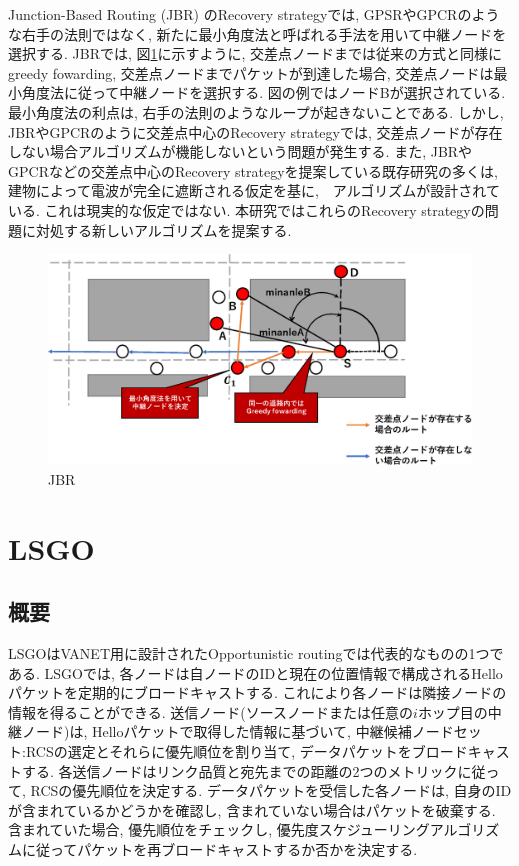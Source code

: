 \documentclass[10pt]{jreport}
\begin{document}
Junction-Based Routing (JBR) \cite{JBR}のRecovery strategyでは, GPSRやGPCRのような右手の法則ではなく, 新たに最小角度法と呼ばれる手法を用いて中継ノードを選択する. JBRでは, 図\ref{fig:JBR}に示すように, 交差点ノードまでは従来の方式と同様にgreedy fowarding, 交差点ノードまでパケットが到達した場合, 交差点ノードは最小角度法に従って中継ノードを選択する. 図の例ではノードBが選択されている. 最小角度法の利点は, 右手の法則のようなループが起きないことである. 
しかし, JBRやGPCRのように交差点中心のRecovery strategyでは, 交差点ノードが存在しない場合アルゴリズムが機能しないという問題が発生する. また, JBRやGPCRなどの交差点中心のRecovery strategyを提案している既存研究の多くは, 建物によって電波が完全に遮断される仮定を基に,　アルゴリズムが設計されている. これは現実的な仮定ではない. 
本研究ではこれらのRecovery strategyの問題に対処する新しいアルゴリズムを提案する. 

\begin{figure}[!ht]
	\centering
	\includegraphics[width=140mm]{figures/JBR.eps}
	\caption{JBR}
	\label{fig:JBR}
\end{figure}



\chapter{LSGO}
\label{LSGO}
\section{概要}
LSGO\cite{18}はVANET用に設計されたOpportunistic routingでは代表的なものの1つである.
LSGOでは, 各ノードは自ノードのIDと現在の位置情報で構成されるHelloパケットを定期的にブロードキャストする. これにより各ノードは隣接ノードの情報を得ることができる.
送信ノード(ソースノードまたは任意の$i$ホップ目の中継ノード)は, Helloパケットで取得した情報に基づいて, 中継候補ノードセット:RCSの選定とそれらに優先順位を割り当て, データパケットをブロードキャストする. 各送信ノードはリンク品質と宛先までの距離の2つのメトリックに従って, RCSの優先順位を決定する. データパケットを受信した各ノードは, 自身のIDが含まれているかどうかを確認し, 含まれていない場合はパケットを破棄する. 含まれていた場合, 優先順位をチェックし, 優先度スケジューリングアルゴリズムに従ってパケットを再ブロードキャストするか否かを決定する.
\end{document}
